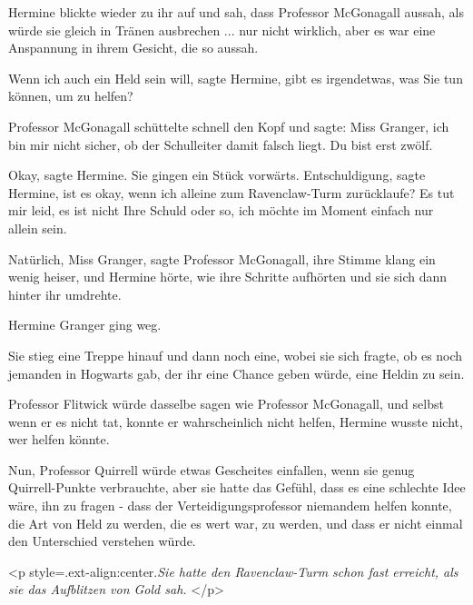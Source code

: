 Hermine blickte wieder zu ihr auf und sah, dass Professor McGonagall aussah, als
würde sie gleich in Tränen ausbrechen ... nur nicht wirklich, aber es war eine
Anspannung in ihrem Gesicht, die so aussah.

\glqq Wenn ich auch ein Held sein will\grqq{}, sagte Hermine, \glqq gibt es
irgendetwas, was Sie tun können, um zu helfen?\grqq{}

Professor McGonagall schüttelte schnell den Kopf und sagte: \glqq Miss Granger,
ich bin mir nicht sicher, ob der Schulleiter damit falsch liegt. Du bist erst
zwölf.\grqq{}

\glqq Okay\grqq{}, sagte Hermine. Sie gingen ein Stück vorwärts. \glqq
Entschuldigung\grqq{}, sagte Hermine, \glqq ist es okay, wenn ich alleine zum
Ravenclaw-Turm zurücklaufe? Es tut mir leid, es ist nicht Ihre Schuld oder so,
ich möchte im Moment einfach nur allein sein.\grqq{}

\glqq Natürlich, Miss Granger\grqq{}, sagte Professor McGonagall, ihre Stimme
klang ein wenig heiser, und Hermine hörte, wie ihre Schritte aufhörten und sie
sich dann hinter ihr umdrehte.

Hermine Granger ging weg.

Sie stieg eine Treppe hinauf und dann noch eine, wobei sie sich fragte, ob es
noch jemanden in Hogwarts gab, der ihr eine Chance geben würde, eine Heldin zu
sein.

Professor Flitwick würde dasselbe sagen wie Professor McGonagall, und selbst
wenn er es nicht tat, konnte er wahrscheinlich nicht helfen, Hermine wusste
nicht, wer helfen könnte.

Nun, Professor Quirrell würde etwas Gescheites einfallen, wenn sie genug
Quirrell-Punkte verbrauchte, aber sie hatte das Gefühl, dass es eine schlechte
Idee wäre, ihn zu fragen - dass der Verteidigungsprofessor niemandem helfen
konnte, die Art von Held zu werden, die es wert war, zu werden, und dass er
nicht einmal den Unterschied verstehen würde.

<p style=\grqq{}.ext-align:center\grqq{}.\emph{Sie hatte den Ravenclaw-Turm
schon fast erreicht, als sie das Aufblitzen von Gold sah. }</p>


